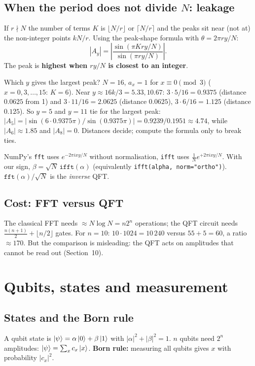 \documentclass[11pt,a4paper,openany]{book}
\newcounter{wex}[chapter]
\begin{document}
\subsection{When the period does not divide $N$: leakage}
If $r \nmid N$ the number of terms $K$ is $\lfloor N/r\rfloor$ or $\lceil N/r\rceil$ and the peaks sit near (not at) the non-integer
points $kN/r$. Using the peak-shape formula with $\theta = 2\pi r y/N$:
\[ |A_y| = \left|\frac{\sin(\pi K r y/N)}{\sin(\pi r y/N)}\right| . \]
The peak is \textbf{highest when $ry/N$ is closest to an integer}.

\begin{wexample}{Which $y$ gives the largest peak?}
$N = 16$, $a_x = 1$ for $x \equiv 0 \pmod 3$ ($x = 0, 3, \dots, 15$: $K = 6$). Near $y \approx 16k/3 = 5.33, 10.67$:
$3\cdot5/16 = 0.9375$ (distance $0.0625$ from 1) and $3\cdot 11/16 = 2.0625$ (distance $0.0625$), $3\cdot 6/16 = 1.125$ (distance $0.125$).
So $y = 5$ and $y = 11$ tie for the largest peak: $|A_5| = |\sin(6\cdot0.9375\pi)/\sin(0.9375\pi)| = 0.9239/0.1951 \approx 4.74$, while $|A_6| \approx 1.85$ and $|A_8| = 0$.
Distances decide; compute the formula only to break ties.
\end{wexample}

\begin{trap}
NumPy's \texttt{fft} uses $e^{-2\pi i xy/N}$ without normalisation, \texttt{ifft} uses $\frac1N e^{+2\pi i xy/N}$. With our sign,
$\beta = \sqrt N\,\texttt{ifft}(\alpha)$ (equivalently \texttt{ifft(alpha, norm="ortho")}). $\texttt{fft}(\alpha)/\sqrt N$ is the \emph{inverse} QFT.
\end{trap}

\subsection{Cost: FFT versus QFT}
The classical FFT needs $\approx N\log N = n2^n$ operations; the QFT circuit needs $\frac{n(n+1)}{2} + \lfloor n/2\rfloor$ gates.
For $n = 10$: $10\cdot1024 = 10\,240$ versus $55 + 5 = 60$, a ratio $\approx 170$. But the comparison is misleading: the
QFT acts on amplitudes that cannot be read out (Section~10).

\section{Qubits, states and measurement}
\subsection{States and the Born rule}
A qubit state is $\ket\psi = \alpha\ket0 + \beta\ket1$ with $|\alpha|^2 + |\beta|^2 = 1$. $n$ qubits need $2^n$ amplitudes:
$\ket\psi = \sum_x c_x\ket x$. \textbf{Born rule:} measuring all qubits gives $x$ with probability $|c_x|^2$.
\end{document}
